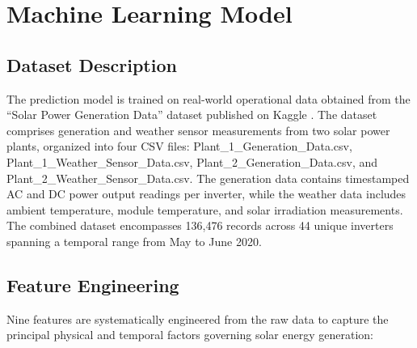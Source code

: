 \documentclass[conference]{IEEEtran}
\begin{document}
\section{Machine Learning Model}

\subsection{Dataset Description}

The prediction model is trained on real-world operational data obtained from the ``Solar Power Generation Data'' dataset published on Kaggle \cite{b12}. The dataset comprises generation and weather sensor measurements from two solar power plants, organized into four CSV files: Plant\_1\_Generation\_Data.csv, Plant\_1\_Weather\_Sensor\_Data.csv, Plant\_2\_Generation\_Data.csv, and Plant\_2\_Weather\_Sensor\_Data.csv. The generation data contains timestamped AC and DC power output readings per inverter, while the weather data includes ambient temperature, module temperature, and solar irradiation measurements. The combined dataset encompasses 136,476 records across 44 unique inverters spanning a temporal range from May to June 2020.

\subsection{Feature Engineering}

Nine features are systematically engineered from the raw data to capture the principal physical and temporal factors governing solar energy generation:
\end{document}
